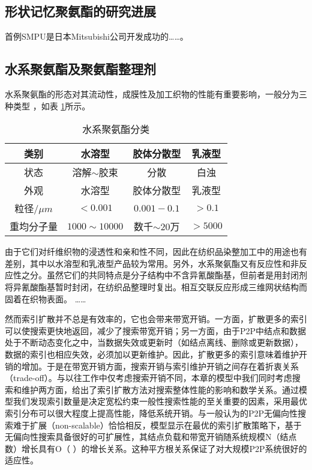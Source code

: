 \subsection{形状记忆聚氨酯的研究进展}
首例SMPU是日本Mitsubishi公司开发成功的……。

\subsection{水系聚氨酯及聚氨酯整理剂}

水系聚氨酯的形态对其流动性，成膜性及加工织物的性能有重要影响，一般分为三种类型\cite{Jiang2005Size} ，如表 \ref{tab:category}所示。

\begin{table}
  \centering
  \caption{水系聚氨酯分类} \label{tab:category}
  \begin{tabular*}{0.9\textwidth}{@{\extracolsep{\fill}}cccc}
  \toprule
    类别			&水溶型		&胶体分散型		&乳液型 \\
  \midrule
    状态			&溶解$\sim$胶束	&分散		&白浊 \\
    外观			&水溶型		&胶体分散型		&乳液型 \\
    粒径$/\mu m$	&$<0.001$		&$0.001-0.1$		&$>0.1$ \\
    重均分子量	&$1000\sim 10000$	&数千$\sim 20万$ &$>5000$ \\
  \bottomrule
  \end{tabular*}
\end{table}

由于它们对纤维织物的浸透性和亲和性不同，因此在纺织品染整加工中的用途也有差别，其中以水溶型和乳液型产品较为常用。另外，水系聚氨酯又有反应性和非反应性之分。虽然它们的共同特点是分子结构中不含异氰酸酯基，但前者是用封闭剂将异氰酸酯基暂时封闭，在纺织品整理时复出。相互交联反应形成三维网状结构而固着在织物表面。
……

然而索引扩散并不总是有效率的，它也会带来带宽开销。一方面，扩散更多的索引可以使搜索更快地返回，减少了搜索带宽开销；另一方面，由于P2P中结点和数据处于不断动态变化之中，当数据失效或更新时（如结点离线、删除或更新数据），数据的索引也相应失效，必须加以更新维护。因此，扩散更多的索引意味着维护开销的增加。于是在带宽开销方面，搜索开销与索引维护开销之间存在着折衷关系（trade-off）。与以往工作中仅考虑搜索开销不同，本章的模型中我们同时考虑搜索和维护两方面，给出了索引扩散方法对搜索整体性能的影响和数学关系。通过模型我们发现索引数量是决定宽松约束一般性搜索性能的至关重要的因素，采用最优索引分布可以很大程度上提高性能，降低系统开销。与一般认为的P2P无偏向性搜索难于扩展（non-scalable）恰恰相反，模型显示在最优的索引扩散策略下，基于无偏向性搜索具备很好的可扩展性，其结点负载和带宽开销随系统规模N（结点数）增长具有O（ ）的增长关系。这种平方根关系保证了对大规模P2P系统很好的适应性。

